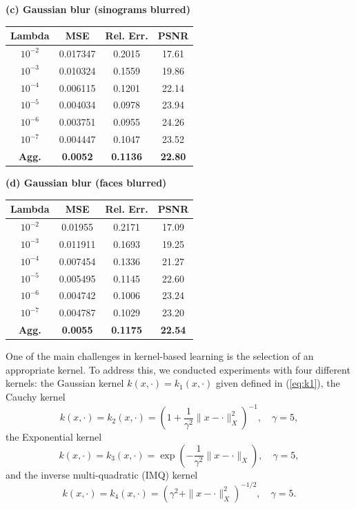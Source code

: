 \documentclass[twoside,11pt]{article}
\begin{document}
{\begin{table}[t]
\begin{minipage}[t]{0.48\textwidth}
\centering
\small
\textbf{(c) Gaussian blur (sinograms blurred)}\\
\renewcommand{\arraystretch}{1.15}
\begin{tabular}{cccc}
\toprule
Lambda & MSE & Rel. Err. & PSNR \\
\midrule
$10^{-2}$ & 0.017347 & 0.2015 & 17.61 \\
$10^{-3}$ & 0.010324 & 0.1559 & 19.86 \\
$10^{-4}$ & 0.006115 & 0.1201 & 22.14 \\
$10^{-5}$ & 0.004034 & 0.0978 & 23.94 \\
$10^{-6}$ & 0.003751 & 0.0955 & 24.26 \\
$10^{-7}$ & 0.004447 & 0.1047 & 23.52 \\
\midrule
\textbf{Agg.} & \textbf{0.0052} & \textbf{0.1136} & \textbf{22.80} \\
\bottomrule
\end{tabular}
\end{minipage}
\hfill
\begin{minipage}[t]{0.48\textwidth}
\centering
\small
\textbf{(d) Gaussian blur (faces blurred)}\\
\renewcommand{\arraystretch}{1.15}
\begin{tabular}{cccc}
\toprule
Lambda & MSE & Rel. Err. & PSNR \\
\midrule
$10^{-2}$ & 0.01955 & 0.2171 & 17.09 \\
$10^{-3}$ & 0.011911 & 0.1693 & 19.25 \\
$10^{-4}$ & 0.007454 & 0.1336 & 21.27 \\
$10^{-5}$ & 0.005495 & 0.1145 & 22.60 \\
$10^{-6}$ & 0.004742 & 0.1006 & 23.24 \\
$10^{-7}$ & 0.004787 & 0.1029 & 23.20 \\
\midrule
\textbf{Agg.} & \textbf{0.0055} & \textbf{0.1175} & \textbf{22.54} \\
\bottomrule
\end{tabular}
\end{minipage}

\end{table}
}
\newpage
One of the main challenges in kernel-based learning is the selection of an appropriate kernel. To address this, we conducted experiments with four different kernels: the Gaussian kernel $k(x,\cdot) = k_1(x,\cdot)$ given defined in (\ref{eq:k1}), the Cauchy kernel
\[
k(x, \cdot) = k_2(x,\cdot)= \left(1 + \frac{1}{\gamma^2} \| x - \cdot\|^2_X\right)^{-1}, \quad \gamma = 5,
\]
the Exponential kernel
\[
k(x, \cdot) = k_3(x,\cdot)= \exp\!\left(-\frac{1}{\gamma^2} \| x - \cdot\|_X\right), \quad \gamma = 5,
\]
and the inverse multi-quadratic (IMQ) kernel 
\[
k(x, \cdot) = k_4(x,\cdot)= \left(\gamma^2 + \| x - \cdot\|^2_X\right)^{-1/2}, \quad \gamma = 5.
\]
\end{document}
